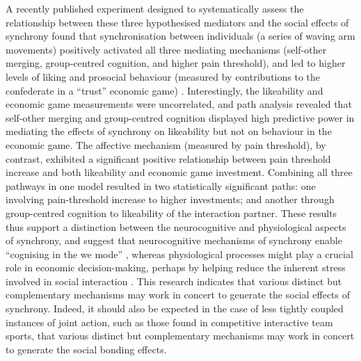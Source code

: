 \begin{CJK}{UTF8}{gbsn}
A recently published experiment designed to systematically assess the relationship between these three hypothesised mediators and the social effects of synchrony found that synchronisation between individuals (a series of waving arm movements) positively activated all three mediating mechanisms (self-other merging, group-centred cognition, and higher pain threshold), and led to higher levels of liking and prosocial behaviour (measured by contributions to the confederate in a ``trust'' economic game) \citep{Lang2017}.  Interestingly, the likeability and economic game measurements were uncorrelated, and path analysis revealed that self-other merging and group-centred cognition displayed high predictive power
in mediating the effects of synchrony on likeability but not on behaviour in the economic game.  The affective mechanism (measured by pain threshold), by contrast, exhibited a significant positive relationship between pain threshold increase and both likeability and economic game investment.  Combining all three pathways in one model resulted in two statistically significant paths: one involving pain-threshold increase to higher investments; and another through group-centred cognition to likeability of the interaction partner.  These results thus support a distinction between the neurocognitive and physiological aspects of synchrony, and suggest that neurocognitive mechanisms of synchrony enable ``cognising in the we mode'' \citep{Gallotti2013,Hasson2016,Kirschner2010}, whereas physiological processes might play a crucial role in economic decision-making, perhaps by helping reduce the inherent stress involved in social interaction \citep{Mogan2017,Kret2015,Stanley2011}. This research indicates that various distinct but complementary mechanisms may work in concert to generate the social effects of synchrony.  Indeed, it should also be expected in the case of less tightly coupled instances of joint action, such as those found in competitive interactive team sports, that various distinct but complementary mechanisms may work in concert to generate the social bonding effects.




\end{CJK}
